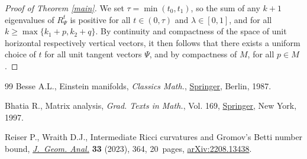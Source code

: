 \documentclass[11pt]{article}
\numberwithin{equation}{section}
\numberwithin{equation}{section}
\begin{document}
\begin{proof}[Proof of Theorem \ref{main}]
	We set $\tau=\min(t_0,t_1)$, so the sum of any $k+1$ eigenvalues of $R_\Psi^t$ is positive for all $t\in(0,\tau)$ and $\lambda\in[0,1]$, and for all $k\geq \max\{k_1+p,k_2+q\}$. By continuity and compactness of the space of unit horizontal respectively vertical vectors, it then follows that there exists a uniform choice of $t$ for all unit tangent vectors $\Psi$, and by compactness of $M$, for all $p\in M$.
\end{proof}
\begin{thebibliography}{99}
Besse A.L., Einstein manifolds, \textit{Classics Math.}, \href{https://doi.org/10.1007/978-3-540-74311-8}{Springer}, Berlin, 1987.

Bhatia R., Matrix analysis, \textit{Grad. Texts in Math.}, Vol. 169, \href{https://doi.org/10.1007/978-1-4612-0653-8}{Springer},
 New York, 1997.

Reiser P., Wraith D.J., Intermediate {R}icci curvatures and {G}romov's {B}etti
 number bound, \href{https://doi.org/10.1007/s12220-023-01423-6}{\textit{J.~Geom. Anal.}} \textbf{33} (2023), 364, 20~pages,
 \href{https://arxiv.org/abs/2208.13438}{arXiv:2208.13438}.

\end{thebibliography}
\end{document}
